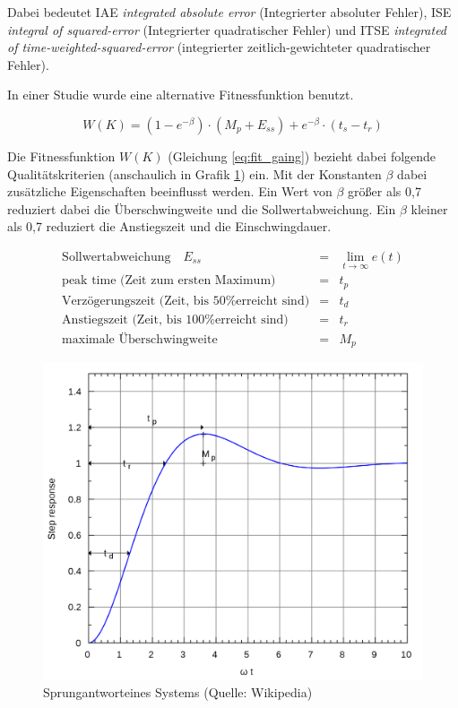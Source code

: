 Dabei bedeutet IAE \textit{integrated absolute error} (Integrierter absoluter
Fehler), ISE \textit{ integral of squared-error} (Integrierter quadratischer
Fehler) und ITSE \textit{integrated of time-weighted-squared-error}
(integrierter zeitlich-gewichteter quadratischer Fehler).

In einer Studie \parencite{bib:pso_pid_gaing} wurde eine alternative
Fitnessfunktion benutzt.

\begin{equation}
    W(K)=(1-e^{-\beta})\cdot (M_p+E_{ss})+e^{-\beta}\cdot (t_s-t_r) \label{eq:fit_gaing}
\end{equation}

Die Fitnessfunktion $W(K)$ (Gleichung \ref{eq:fit_gaing}) bezieht dabei folgende
Qualit\"atskriterien (anschaulich in Grafik \ref{img:stepresponse}) ein. Mit der
Konstanten $\beta$ dabei zus\"atzliche Eigenschaften beeinflusst werden. Ein
Wert von $\beta$ gr\"o\ss er als 0,7 reduziert dabei die \"Uberschwingweite und
die Sollwertabweichung. Ein $\beta$ kleiner als 0,7 reduziert die Anstiegszeit
und die Einschwingdauer.

\begin{eqnarray}
    \textrm{Sollwertabweichung}\quad E_{ss}&=&\lim_{t \to \infty}e(t)\\
    \textrm{peak time (Zeit zum ersten Maximum)} &=& t_p\\
    \textrm{Verz\"ogerungszeit (Zeit, bis 50\% erreicht sind)} &=& t_d \\
    \textrm{Anstiegszeit (Zeit, bis 100\% erreicht sind)} &=& t_r \\
    \textrm{maximale \"Uberschwingweite} &=& M_p 
\end{eqnarray}

\begin{figure}[hbtp]
    \centering
    \includegraphics[width=0.8\linewidth]{images/2000px-Second_order_under-damped_response}
    \caption{Sprungantwort\protect\footnotemark eines Systems (Quelle: Wikipedia)}
    \label{img:stepresponse}
\end{figure}

